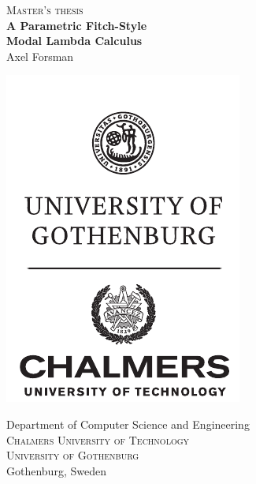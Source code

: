 \documentclass[12pt,twoside,openright]{report}
\numberwithin{equation}{chapter}
\numberwithin{figure}{chapter}
\numberwithin{table}{chapter}
\theoremstyle{definition}\newtheorem{definition}{Definition}
\newcommand{\multiLineTitle}[1]{A Parametric Fitch-Style \\[#1] Modal Lambda Calculus}
\begin{document}
\newpage
\renewcommand{\familydefault}{\rmdefault}\normalfont
\restoregeometry
\thispagestyle{empty}
\mbox{}

\newpage
\thispagestyle{empty}
\begin{center}
	\textsc{\large Master's thesis \the\year} \\[4cm]
	\textbf{\Large \multiLineTitle{0.2cm}} \\[2cm]
	{\large Axel Forsman}

	\vfill
    \begin{center}
	\includegraphics[width=0.25\pagewidth]{ChGULogo}
    \end{center}
	\vspace{5mm}

	Department of Computer Science and Engineering \\
	\textsc{Chalmers University of Technology} \\
	\textsc{University of Gothenburg} \\
	Gothenburg, Sweden \the\year
\end{center}
\end{document}
